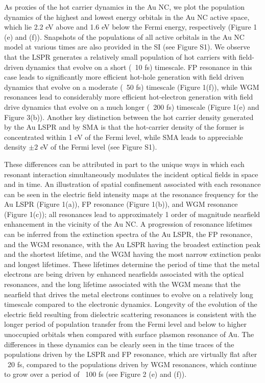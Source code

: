 \documentclass[journal=jpclcd,manuscript=article]{achemso}
\begin{document}
As proxies of the hot carrier dynamics in the Au NC, we plot the population dynamics of the highest and lowest energy orbitals in the Au NC active space, which lie
2.2 eV above and 1.6 eV below the Fermi energy, respectively (Figure 1 (e) and (f)).  Snapshots of the populations of all active
orbitals in the Au NC model at various times are also provided in the SI (see Figure S1).  
We observe that the LSPR generates a relatively small
population of hot carriers with field-driven dynamics that evolve on a short (~10 fs) timescale.  FP resonance in this
case leads to significantly more efficient hot-hole generation with field driven dynamics that evolve on a moderate (~50 fs) timescale (Figure 1(f)), while
WGM resonances lead to considerably more efficient hot-electron generation with field drive dynamics that evolve on a much longer (~200 fs) timescale
(Figure 1(e) and Figure 3(b)).  Another key distinction between the hot carrier density generated by the Au LSPR and by SMA is that the hot-carrier density
of the former is concentrated within 1 eV of the Fermi level, while SMA leads to appreciable density $\pm 2$ eV of the Fermi level (see Figure S1).

These differences can be attributed in part to the unique ways in which each resonant interaction simultaneously modulates the incident optical
fields in space and in time. An illustration of spatial confinement associated with each resonance can be seen in the
electric field intensity maps at the resonance frequency for the
Au LSPR (Figure 1(a)), FP resonance (Figure 1(b)), and WGM resonance (Figure 1(c)); all resonances lead to approximately 1 order of
magnitude nearfield enhancement in the vicinity of the Au NC.
A progression of resonance lifetimes can be inferred from the extinction spectra of the Au LSPR, the FP resonance, and the WGM resonance, with
the Au LSPR having the broadest extinction peak and the shortest lifetime, and the WGM having the most narrow extinction peaks and longest lifetimes.  These
lifetimes determine the period of time that the metal electrons are being driven by enhanced nearfields associated with the optical resonances, and
the long lifetime associated with the WGM means that the nearfield that drives the metal electrons continues to evolve on a relatively long timescale compared
to the electronic dynamics.
Longevity of the evolution of the electric field resulting from dielectric scattering resonances is consistent with the 
longer period of population transfer from the Fermi level and below to higher unoccupied orbitals when compared with surface plasmon
resonance of Au.  The differences in these dynamics can be clearly seen in the time traces of the populations driven
by the LSPR and FP resonance, which are virtually flat after ~20 fs, compared to the populations driven by WGM resonances, which continue to grow over
a period of ~100 fs (see Figure 2 (e) and (f)). 
\end{document}
